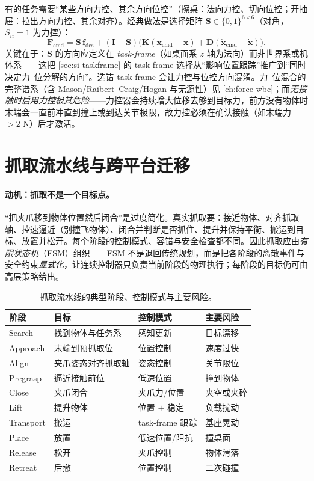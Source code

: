 \begin{insight}
有的任务需要“某些方向力控、其余方向位控”（擦桌：法向力控、切向位控；开抽屉：拉出方向力控、其余对齐）。经典做法是选择矩阵 $\mathbf S\in\{0,1\}^{6\times6}$（对角，$S_{ii}=1$ 为力控）：
\[
  \mathbf F_{\mathrm{cmd}}=\mathbf S\,\mathbf f_{\mathrm{des}}+(\mathbf I-\mathbf S)\big(\mathbf K(\mathbf x_{\mathrm{cmd}}-\mathbf x)+\mathbf D(\dot{\mathbf x}_{\mathrm{cmd}}-\dot{\mathbf x})\big).
\]
关键在于：$\mathbf S$ 的方向应定义在 \emph{task-frame}（如桌面系 $z$ 轴为法向）而非世界系或机体系——这把 \cref{sec:si-taskframe} 的 task-frame 选择从“影响位置跟踪”推广到“同时决定力--位分解的方向”。选错 task-frame 会让力控与位控方向混淆。力--位混合的完整谱系（含 Mason/Raibert--Craig/Hogan 与无源性）见 \cref{ch:force-wbc}；而\emph{无接触时启用力控极其危险}——力控器会持续增大位移去够到目标力，前方没有物体时末端会一直前冲直到撞上或到达关节极限，故力控必须在确认接触（如末端力 $>2$ N）后才激活。
\end{insight}

\section{抓取流水线与跨平台迁移}
\label{sec:si-grasp}

\paragraph{动机：抓取不是一个目标点。}
“把夹爪移到物体位置然后闭合”是过度简化。真实抓取要：接近物体、对齐抓取轴、控速逼近（别撞飞物体）、闭合并判断是否抓住、提升并保持平衡、搬运到目标、放置并松开。每个阶段的控制模式、容错与安全检查都不同。因此抓取应由\emph{有限状态机}（FSM）组织——FSM 不是退回传统规划，而是把各阶段的离散事件与安全约束\emph{显式化}，让连续控制器只负责当前阶段的物理执行；每阶段的目标仍可由高层策略给出。

\begin{table}[H]\centering\small
\caption{抓取流水线的典型阶段、控制模式与主要风险。}
\label{tab:si-grasp-stages}
\begin{tabular}{llll}
\toprule
阶段 & 目标 & 控制模式 & 主要风险 \\
\midrule
Search & 找到物体与任务系 & 感知更新 & 目标漂移 \\
Approach & 末端到预抓取位 & 位置控制 & 速度过快 \\
Align & 夹爪姿态对齐抓取轴 & 姿态控制 & 关节限位 \\
Pregrasp & 逼近接触前位 & 低速位置 & 撞到物体 \\
Close & 夹爪闭合 & 夹爪力/位置 & 夹空或夹碎 \\
Lift & 提升物体 & 位置 $+$ 稳定 & 负载扰动 \\
Transport & 搬运 & task-frame 跟踪 & 基座晃动 \\
Place & 放置 & 低速位置/阻抗 & 撞桌面 \\
Release & 松开 & 夹爪控制 & 物体滑落 \\
Retreat & 后撤 & 位置控制 & 二次碰撞 \\
\bottomrule
\end{tabular}
\end{table}

